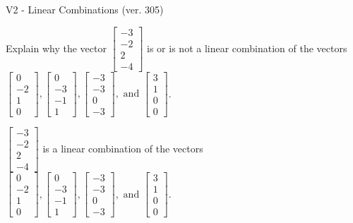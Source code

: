 \begin{exercise}
  \begin{exerciseTitle}V2 - Linear Combinations (ver. 305)\end{exerciseTitle}
  \begin{exerciseStatement}
    Explain why the vector \(\left[\begin{array}{c}
-3 \\
-2 \\
2 \\
-4
\end{array}\right]\)  is or is not a linear 
	combination of the vectors \(\left[\begin{array}{c}
0 \\
-2 \\
1 \\
0
\end{array}\right] , \left[\begin{array}{c}
0 \\
-3 \\
-1 \\
1
\end{array}\right] , \left[\begin{array}{c}
-3 \\
-3 \\
0 \\
-3
\end{array}\right] , \text{ and } \left[\begin{array}{c}
3 \\
1 \\
0 \\
0
\end{array}\right]\).
	


  \end{exerciseStatement}
  \begin{exerciseAnswer}
   \(\left[\begin{array}{c}
-3 \\
-2 \\
2 \\
-4
\end{array}\right]\) 
  	 is  
	a linear combination of the vectors \(\left[\begin{array}{c}
0 \\
-2 \\
1 \\
0
\end{array}\right] , \left[\begin{array}{c}
0 \\
-3 \\
-1 \\
1
\end{array}\right] , \left[\begin{array}{c}
-3 \\
-3 \\
0 \\
-3
\end{array}\right] , \text{ and } \left[\begin{array}{c}
3 \\
1 \\
0 \\
0
\end{array}\right]\).


\end{exerciseAnswer}
\end{exercise}

